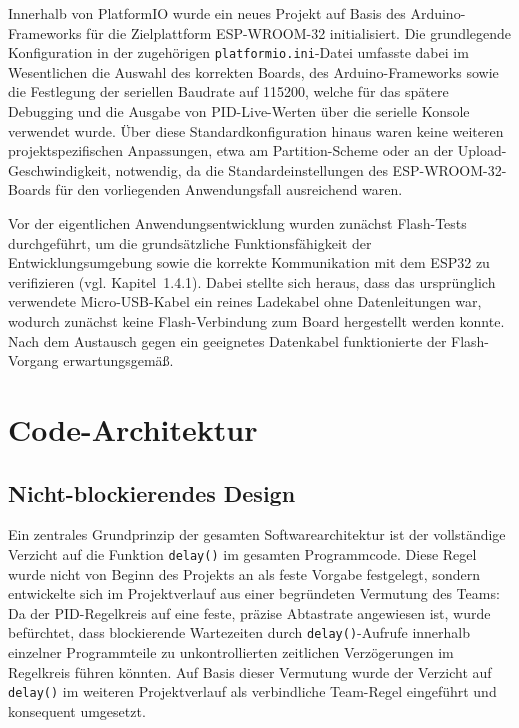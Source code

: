 \documentclass[12pt,ngerman,numbers=noenddot,abstracton,headsepline]{scrreprt}
\begin{document}
Innerhalb von PlatformIO wurde ein neues Projekt auf Basis des Arduino-Frameworks für die Zielplattform ESP-WROOM-32 initialisiert. Die grundlegende Konfiguration in der zugehörigen \texttt{platformio.ini}-Datei umfasste dabei im Wesentlichen die Auswahl des korrekten Boards, des Arduino-Frameworks sowie die Festlegung der seriellen Baudrate auf 115200, welche für das spätere Debugging und die Ausgabe von PID-Live-Werten über die serielle Konsole verwendet wurde. Über diese Standardkonfiguration hinaus waren keine weiteren projektspezifischen Anpassungen, etwa am Partition-Scheme oder an der Upload-Geschwindigkeit, notwendig, da die Standardeinstellungen des ESP-WROOM-32-Boards für den vorliegenden Anwendungsfall ausreichend waren.

Vor der eigentlichen Anwendungsentwicklung wurden zunächst Flash-Tests durchgeführt, um die grundsätzliche Funktionsfähigkeit der Entwicklungsumgebung sowie die korrekte Kommunikation mit dem ESP32 zu verifizieren (vgl. Kapitel~1.4.1). Dabei stellte sich heraus, dass das ursprünglich verwendete Micro-USB-Kabel ein reines Ladekabel ohne Datenleitungen war, wodurch zunächst keine Flash-Verbindung zum Board hergestellt werden konnte. Nach dem Austausch gegen ein geeignetes Datenkabel funktionierte der Flash-Vorgang erwartungsgemäß.

\section{Code-Architektur}
\label{sec:code_architektur}

\subsection{Nicht-blockierendes Design}
\label{subsec:nicht_blockierend}

Ein zentrales Grundprinzip der gesamten Softwarearchitektur ist der vollständige Verzicht auf die Funktion \texttt{delay()} im gesamten Programmcode. Diese Regel wurde nicht von Beginn des Projekts an als feste Vorgabe festgelegt, sondern entwickelte sich im Projektverlauf aus einer begründeten Vermutung des Teams: Da der PID-Regelkreis auf eine feste, präzise Abtastrate angewiesen ist, wurde befürchtet, dass blockierende Wartezeiten durch \texttt{delay()}-Aufrufe innerhalb einzelner Programmteile zu unkontrollierten zeitlichen Verzögerungen im Regelkreis führen könnten. Auf Basis dieser Vermutung wurde der Verzicht auf \texttt{delay()} im weiteren Projektverlauf als verbindliche Team-Regel eingeführt und konsequent umgesetzt.
\end{document}
